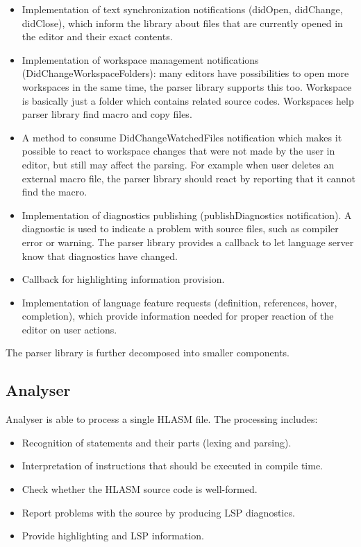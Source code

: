 \begin{itemize}
	\item Implementation of text synchronization notifications (didOpen, didChange, didClose), which inform the library about files that are currently opened in the editor and their exact contents.
	\item Implementation of workspace management notifications (DidChangeWorkspaceFolders): many editors have possibilities to open more workspaces in the same time, the parser library supports this too. Workspace is basically just a folder which contains related source codes. Workspaces help parser library find macro and copy files.
	\item A method to consume DidChangeWatchedFiles notification which makes it possible to react to workspace changes that were not made by the user in editor, but still may affect the parsing. For example when user deletes an external macro file, the parser library should react by reporting that it cannot find the macro.
	\item Implementation of diagnostics publishing (publishDiagnostics notification). A diagnostic is used to indicate a problem with source files, such as compiler error or warning. The parser library provides a callback to let language server know that diagnostics have changed.
	\item Callback for highlighting information provision.
	\item Implementation of language feature requests (definition, references, hover, completion), which provide information needed for proper reaction of the editor on user actions.
	
\end{itemize}

The parser library is further decomposed into smaller components.

\subsection{Analyser}

Analyser is able to process a single HLASM file. The processing includes:
\begin{itemize}
 \item Recognition of statements and their parts (lexing and parsing).
 \item Interpretation of instructions that should be executed in compile time.
 \item Check whether the HLASM source code is well-formed.
 \item Report problems with the source by producing LSP diagnostics.
 \item Provide highlighting and LSP information.
\end{itemize}

